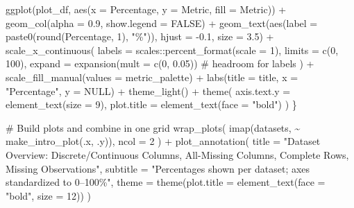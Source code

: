 \documentclass[
  letterpaper,
  DIV=11,
  numbers=noendperiod]{scrartcl}
\newenvironment{Shaded}{\begin{snugshade}}{\end{snugshade}}
\newcommand{\AttributeTok}[1]{\textcolor[rgb]{0.40,0.45,0.13}{#1}}
\newcommand{\CommentTok}[1]{\textcolor[rgb]{0.37,0.37,0.37}{#1}}
\newcommand{\ConstantTok}[1]{\textcolor[rgb]{0.56,0.35,0.01}{#1}}
\newcommand{\DecValTok}[1]{\textcolor[rgb]{0.68,0.00,0.00}{#1}}
\newcommand{\FloatTok}[1]{\textcolor[rgb]{0.68,0.00,0.00}{#1}}
\newcommand{\FunctionTok}[1]{\textcolor[rgb]{0.28,0.35,0.67}{#1}}
\newcommand{\NormalTok}[1]{\textcolor[rgb]{0.00,0.23,0.31}{#1}}
\newcommand{\SpecialCharTok}[1]{\textcolor[rgb]{0.37,0.37,0.37}{#1}}
\newcommand{\StringTok}[1]{\textcolor[rgb]{0.13,0.47,0.30}{#1}}
\begin{document}
\begin{Shaded}
\begin{Highlighting}[]
  \FunctionTok{ggplot}\NormalTok{(plot\_df, }\FunctionTok{aes}\NormalTok{(}\AttributeTok{x =}\NormalTok{ Percentage, }\AttributeTok{y =}\NormalTok{ Metric, }\AttributeTok{fill =}\NormalTok{ Metric)) }\SpecialCharTok{+}
    \FunctionTok{geom\_col}\NormalTok{(}\AttributeTok{alpha =} \FloatTok{0.9}\NormalTok{, }\AttributeTok{show.legend =} \ConstantTok{FALSE}\NormalTok{) }\SpecialCharTok{+}
    \FunctionTok{geom\_text}\NormalTok{(}\FunctionTok{aes}\NormalTok{(}\AttributeTok{label =} \FunctionTok{paste0}\NormalTok{(}\FunctionTok{round}\NormalTok{(Percentage, }\DecValTok{1}\NormalTok{), }\StringTok{"\%"}\NormalTok{)),}
              \AttributeTok{hjust =} \SpecialCharTok{{-}}\FloatTok{0.1}\NormalTok{, }\AttributeTok{size =} \FloatTok{3.5}\NormalTok{) }\SpecialCharTok{+}
    \FunctionTok{scale\_x\_continuous}\NormalTok{(}
      \AttributeTok{labels =}\NormalTok{ scales}\SpecialCharTok{::}\FunctionTok{percent\_format}\NormalTok{(}\AttributeTok{scale =} \DecValTok{1}\NormalTok{),}
      \AttributeTok{limits =} \FunctionTok{c}\NormalTok{(}\DecValTok{0}\NormalTok{, }\DecValTok{100}\NormalTok{),}
      \AttributeTok{expand =} \FunctionTok{expansion}\NormalTok{(}\AttributeTok{mult =} \FunctionTok{c}\NormalTok{(}\DecValTok{0}\NormalTok{, }\FloatTok{0.05}\NormalTok{)) }\CommentTok{\# headroom for labels}
\NormalTok{    ) }\SpecialCharTok{+}
    \FunctionTok{scale\_fill\_manual}\NormalTok{(}\AttributeTok{values =}\NormalTok{ metric\_palette) }\SpecialCharTok{+}
    \FunctionTok{labs}\NormalTok{(}\AttributeTok{title =}\NormalTok{ title, }\AttributeTok{x =} \StringTok{"Percentage"}\NormalTok{, }\AttributeTok{y =} \ConstantTok{NULL}\NormalTok{) }\SpecialCharTok{+}
    \FunctionTok{theme\_light}\NormalTok{() }\SpecialCharTok{+}
    \FunctionTok{theme}\NormalTok{(}
      \AttributeTok{axis.text.y  =} \FunctionTok{element\_text}\NormalTok{(}\AttributeTok{size =} \DecValTok{9}\NormalTok{),}
      \AttributeTok{plot.title   =} \FunctionTok{element\_text}\NormalTok{(}\AttributeTok{face =} \StringTok{"bold"}\NormalTok{)}
\NormalTok{    )}
\NormalTok{\}}

\CommentTok{\# Build plots and combine in one grid}
\FunctionTok{wrap\_plots}\NormalTok{(}
  \FunctionTok{imap}\NormalTok{(datasets, }\SpecialCharTok{\textasciitilde{}} \FunctionTok{make\_intro\_plot}\NormalTok{(.x, .y)),}
  \AttributeTok{ncol =} \DecValTok{2}
\NormalTok{) }\SpecialCharTok{+}
  \FunctionTok{plot\_annotation}\NormalTok{(}
    \AttributeTok{title =} \StringTok{"Dataset Overview: Discrete/Continuous Columns, All{-}Missing Columns, Complete Rows, Missing Observations"}\NormalTok{,}
    \AttributeTok{subtitle =} \StringTok{"Percentages shown per dataset; axes standardized to 0–100\%"}\NormalTok{,}
    \AttributeTok{theme =} \FunctionTok{theme}\NormalTok{(}\AttributeTok{plot.title =} \FunctionTok{element\_text}\NormalTok{(}\AttributeTok{face =} \StringTok{"bold"}\NormalTok{, }\AttributeTok{size =} \DecValTok{12}\NormalTok{))}
\NormalTok{  )}
\end{Highlighting}
\end{Shaded}
\end{document}
